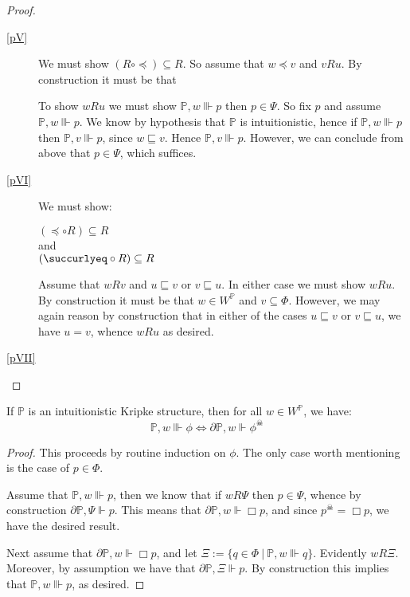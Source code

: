 \begin{proof}
\begin{description}
    \item[\ref{pV}]  We must show $(R \circ \preccurlyeq) \subseteq
      R$.  So assume that $w \preccurlyeq v$ and $v R u$.  By
      construction it must be that 
      To show $w R u$ we must show $\mathbb{P},w \Vvdash p$ 
      then $p \in \Psi$.  So fix $p$ and 
       assume $\mathbb{P},w \Vvdash p$.  We 
      know by hypothesis that $\mathbb{P}$ is intuitionistic, hence 
        if $\mathbb{P},w \Vvdash p$
      then $\mathbb{P},v \Vvdash p$, since $w \sqsubseteq v$.  Hence
      $\mathbb{P},v \Vvdash p$.  However, we can conclude from above
      that $p \in \Psi$, which suffices.
    \item[\ref{pVI}]
We must show:
\begin{center}
 $(\preccurlyeq \circ R)
      \subseteq R$ \\
and\\
    $(\succurlyeq \circ R) \subseteq
    R$
\end{center}
Assume that $w R v$ and $u \sqsubseteq v$ or $v \sqsubseteq u$.  In
either case we must show $w R u$.  By construction
      it must be that $w \in W^\mathbb{P}$ and $v \subseteq \Phi$.  
However, we may
      again reason by construction that in either of the cases 
$u \sqsubseteq v$ or $v \sqsubseteq u$, we have $u = v$, whence $w R u$ as desired.
    \item[\ref{pVII}]  

  \end{description}
\end{proof}

\begin{lemma}\label{evilcompanion}
If $\mathbb{P}$ is an intuitionistic Kripke structure, then for all $w
\in W^{\mathbb{P}}$, we have: 
\[\mathbb{P},w\Vvdash \phi \iff \partial \mathbb{P},w \Vdash
\phi^\skull \]
\end{lemma}
\begin{proof}
This proceeds by routine induction on $\phi$.  The only case worth
mentioning is the case of $p \in \Phi$.

Assume that $\mathbb{P},w\Vvdash p$, then we know that if $w R \Psi$
then $p \in \Psi$, whence by construction $\partial \mathbb{P}, \Psi
\Vdash p$.  This means that $\partial \mathbb{P}, w\Vdash \Box p$, and
since $p^\skull = \Box p$, we have the desired result.

Next assume that $\partial \mathbb{P}, w\Vdash \Box p$, and let $\Xi
:= \{ q\in \Phi \ |\ \mathbb{P},w\Vvdash q\}$.  Evidently $w R \Xi$.
Moreover, by assumption we have that $\partial
\mathbb{P}, \Xi \Vdash p$.  By construction this implies that $\mathbb{P},
w\Vvdash p$, as desired.
\end{proof}

